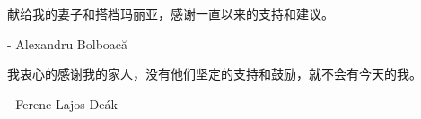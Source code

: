 ﻿献给我的妻子和搭档玛丽亚，感谢一直以来的支持和建议。

\begin{flushright}
- Alexandru Bolboacă
\end{flushright}


我衷心的感谢我的家人，没有他们坚定的支持和鼓励，就不会有今天的我。

\begin{flushright}
- Ferenc-Lajos Deák
\end{flushright}
